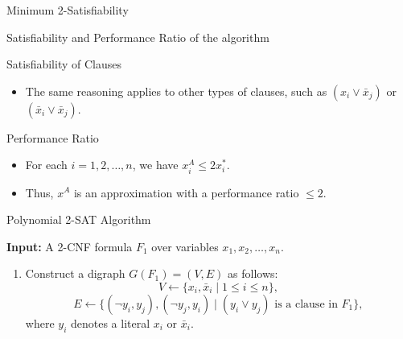 \documentclass[xcolor=svgnames]{beamer}
\begin{document}
\begin{section}{Minimum 2-Satisfiability}
\begin{frame}{Satisfiability and Performance Ratio of the algorithm}
\begin{block}{Satisfiability of Clauses}
\begin{itemize}
\begin{itemize}
                    \item $x^*_i + x^*_j \geq 1$ implies $x^*_i > \frac{1}{2}$ or $x^*_j > \frac{1}{2}$.
                    \item By step (2), either $x^A_i = 1$ or $x^A_j = 1$, ensuring the clause $(x_i \lor x_j)$ is satisfied.
                \end{itemize}
                \item The same reasoning applies to other types of clauses, such as $(x_i \lor \bar{x}_j)$ or $(\bar{x}_i \lor \bar{x}_j)$.
            \end{itemize}
        \end{block}
        
        \vspace{0.5cm}
        \pause
        \begin{exampleblock}{Performance Ratio}
            \begin{itemize}
                \item For each $i = 1, 2, \ldots, n$, we have $x^A_i \leq 2x^*_i$.
                \item Thus, $x^A$ is an approximation with a performance ratio $\leq 2$.
            \end{itemize}
        \end{exampleblock}
    \end{frame}
    \begin{frame}{Polynomial 2-SAT Algorithm}
    
        \textbf{Input:} A 2-CNF formula $F_1$ over variables $x_1, x_2, \ldots, x_n$.

        \begin{enumerate}
            \item<1-> Construct a digraph $G(F_1) = (V, E)$ as follows:
            \[
            V \gets \{x_i, \bar{x}_i \mid 1 \leq i \leq n\},
            \]
            \[
            E \gets \{(\neg y_i, y_j), (\neg y_j, y_i) \mid (y_i \lor y_j) \text{ is a clause in } F_1\},
            \]
            where $y_i$ denotes a literal $x_i$ or $\bar{x}_i$.
\end{enumerate}
\end{frame}
\end{section}
\end{document}
